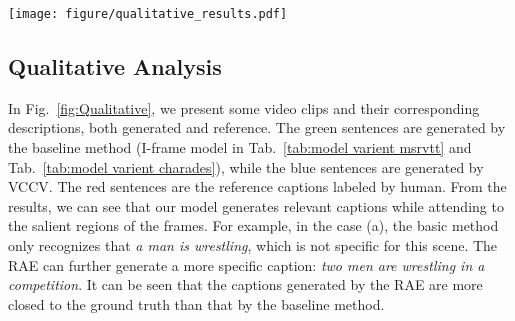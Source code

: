 \documentclass[a4paper,conference]{IEEEtran}
\begin{document}



\begin{figure*}[!h]
\centering
\texttt{[image: figure/qualitative\_results.pdf]}
\caption{Example results of our model on the MSR-VTT dataset. The generated captions and the ground truth are shown. The corresponding spatial attention maps are generated by our VCCV model and visualized as heatmaps. (Best viewed in color)}

\label{fig:Qualitative}
\end{figure*}

\subsection{Qualitative Analysis}
In Fig.~\ref{fig:Qualitative}, we present some video clips and their corresponding descriptions, both generated and reference. The green sentences are generated by the baseline method (I-frame model in Tab.~\ref{tab:model varient msrvtt} and Tab.~\ref{tab:model varient charades}), while the blue sentences are generated by VCCV. The red sentences are the reference captions labeled by human. From the results, we can see that our model generates relevant captions while attending to the salient regions of the frames. For example, in the case (a), the basic method only recognizes that \emph{a man is wrestling}, which is not specific for this scene. The RAE can further generate a more specific caption: \emph{two men are wrestling in a competition}. It can be seen that the captions generated by the RAE are more closed to the ground truth than that by the baseline method.
\end{document}
